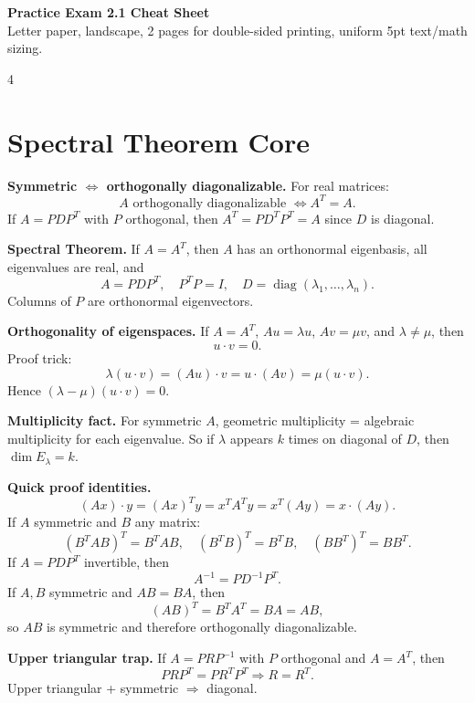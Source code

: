 \documentclass[letterpaper]{article}
\newcommand{\diag}{\operatorname{diag}}
\newcommand{\lam}{\lambda}
\newcommand{\smallhead}[1]{{\bfseries #1}}
\begin{document}
\fontsize{5}{5.2}\selectfont

\begin{center}
{\bfseries Practice Exam 2.1 Cheat Sheet}\\[-0.2ex]
{Letter paper, landscape, 2 pages for double-sided printing, uniform 5pt text/math sizing.}
\end{center}
\vspace{-0.8ex}

\begin{multicols*}{4}
\section{Spectral Theorem Core}
\smallhead{Symmetric $\Leftrightarrow$ orthogonally diagonalizable.} For real matrices:
\[
A \text{ orthogonally diagonalizable } \iff A^T=A.
\]
If $A=PDP^T$ with $P$ orthogonal, then $A^T=P D^T P^T=A$ since $D$ is diagonal.

\smallhead{Spectral Theorem.} If $A=A^T$, then $A$ has an orthonormal eigenbasis, all eigenvalues are real, and
\[
A=PDP^T,\quad P^TP=I,\quad D=\diag(\lambda_1,\dots,\lambda_n).
\]
Columns of $P$ are orthonormal eigenvectors.

\smallhead{Orthogonality of eigenspaces.} If $A=A^T$, $Au=\lam u$, $Av=\mu v$, and $\lam\neq \mu$, then
\[
u\cdot v=0.
\]
Proof trick:
\[
\lam(u\cdot v)=(Au)\cdot v=u\cdot(Av)=\mu(u\cdot v).
\]
Hence $(\lam-\mu)(u\cdot v)=0$.

\smallhead{Multiplicity fact.} For symmetric $A$, geometric multiplicity = algebraic multiplicity for each eigenvalue. So if $\lam$ appears $k$ times on diagonal of $D$, then $\dim E_\lam=k$.

\smallhead{Quick proof identities.}
\[
(Ax)\cdot y=(Ax)^Ty=x^TA^Ty=x^T(Ay)=x\cdot(Ay).
\]
If $A$ symmetric and $B$ any matrix:
\[
(B^TAB)^T=B^TAB,\quad (B^TB)^T=B^TB,\quad (BB^T)^T=BB^T.
\]
If $A=PDP^T$ invertible, then
\[
A^{-1}=PD^{-1}P^T.
\]
If $A,B$ symmetric and $AB=BA$, then
\[
(AB)^T=B^TA^T=BA=AB,
\]
so $AB$ is symmetric and therefore orthogonally diagonalizable.

\smallhead{Upper triangular trap.} If $A=PRP^{-1}$ with $P$ orthogonal and $A=A^T$, then
\[
PRP^T=PR^TP^T \Rightarrow R=R^T.
\]
Upper triangular + symmetric $\Rightarrow$ diagonal.


\end{multicols*}
\end{document}
